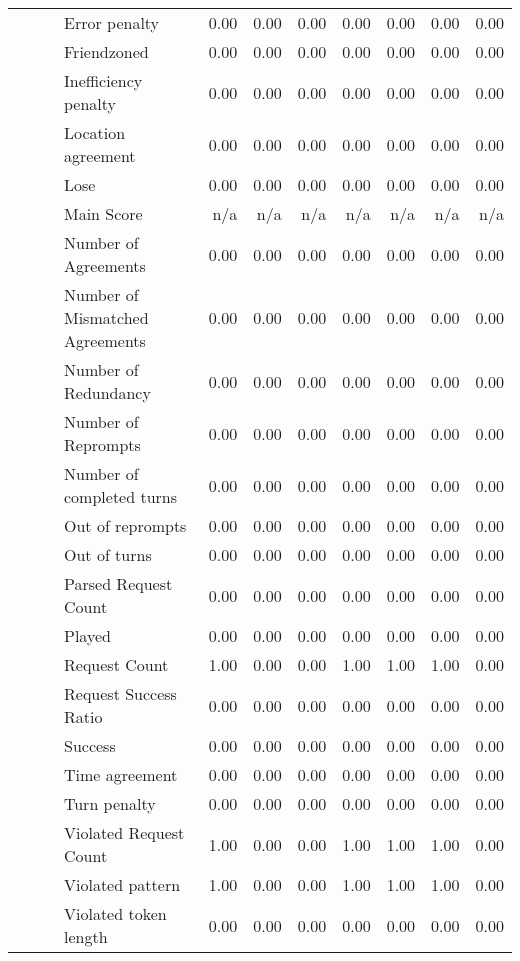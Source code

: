 \begin{tabular}{llllrrrrrrr}
 &  &  & Error penalty & 0.00 & 0.00 & 0.00 & 0.00 & 0.00 & 0.00 & 0.00 \\
 &  &  & Friendzoned & 0.00 & 0.00 & 0.00 & 0.00 & 0.00 & 0.00 & 0.00 \\
 &  &  & Inefficiency penalty & 0.00 & 0.00 & 0.00 & 0.00 & 0.00 & 0.00 & 0.00 \\
 &  &  & Location agreement & 0.00 & 0.00 & 0.00 & 0.00 & 0.00 & 0.00 & 0.00 \\
 &  &  & Lose & 0.00 & 0.00 & 0.00 & 0.00 & 0.00 & 0.00 & 0.00 \\
 &  &  & Main Score & n/a & n/a & n/a & n/a & n/a & n/a & n/a \\
 &  &  & Number of Agreements & 0.00 & 0.00 & 0.00 & 0.00 & 0.00 & 0.00 & 0.00 \\
 &  &  & Number of Mismatched Agreements & 0.00 & 0.00 & 0.00 & 0.00 & 0.00 & 0.00 & 0.00 \\
 &  &  & Number of Redundancy & 0.00 & 0.00 & 0.00 & 0.00 & 0.00 & 0.00 & 0.00 \\
 &  &  & Number of Reprompts & 0.00 & 0.00 & 0.00 & 0.00 & 0.00 & 0.00 & 0.00 \\
 &  &  & Number of completed turns & 0.00 & 0.00 & 0.00 & 0.00 & 0.00 & 0.00 & 0.00 \\
 &  &  & Out of reprompts & 0.00 & 0.00 & 0.00 & 0.00 & 0.00 & 0.00 & 0.00 \\
 &  &  & Out of turns & 0.00 & 0.00 & 0.00 & 0.00 & 0.00 & 0.00 & 0.00 \\
 &  &  & Parsed Request Count & 0.00 & 0.00 & 0.00 & 0.00 & 0.00 & 0.00 & 0.00 \\
 &  &  & Played & 0.00 & 0.00 & 0.00 & 0.00 & 0.00 & 0.00 & 0.00 \\
 &  &  & Request Count & 1.00 & 0.00 & 0.00 & 1.00 & 1.00 & 1.00 & 0.00 \\
 &  &  & Request Success Ratio & 0.00 & 0.00 & 0.00 & 0.00 & 0.00 & 0.00 & 0.00 \\
 &  &  & Success & 0.00 & 0.00 & 0.00 & 0.00 & 0.00 & 0.00 & 0.00 \\
 &  &  & Time agreement & 0.00 & 0.00 & 0.00 & 0.00 & 0.00 & 0.00 & 0.00 \\
 &  &  & Turn penalty & 0.00 & 0.00 & 0.00 & 0.00 & 0.00 & 0.00 & 0.00 \\
 &  &  & Violated Request Count & 1.00 & 0.00 & 0.00 & 1.00 & 1.00 & 1.00 & 0.00 \\
 &  &  & Violated pattern & 1.00 & 0.00 & 0.00 & 1.00 & 1.00 & 1.00 & 0.00 \\
 &  &  & Violated token length & 0.00 & 0.00 & 0.00 & 0.00 & 0.00 & 0.00 & 0.00 \\

\end{tabular}
